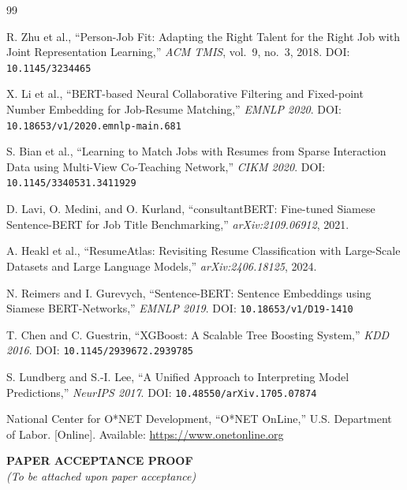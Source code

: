\documentclass[12pt,a4paper]{report}
\begin{document}
\newpage
\begin{thebibliography}{99}

R. Zhu et al., ``Person-Job Fit: Adapting the Right Talent for the Right Job with Joint Representation Learning,'' \textit{ACM TMIS}, vol.~9, no.~3, 2018. DOI: \texttt{10.1145/3234465}

X. Li et al., ``BERT-based Neural Collaborative Filtering and Fixed-point Number Embedding for Job-Resume Matching,'' \textit{EMNLP 2020}. DOI: \texttt{10.18653/v1/2020.emnlp-main.681}

S. Bian et al., ``Learning to Match Jobs with Resumes from Sparse Interaction Data using Multi-View Co-Teaching Network,'' \textit{CIKM 2020}. DOI: \texttt{10.1145/3340531.3411929}

D. Lavi, O. Medini, and O. Kurland, ``consultantBERT: Fine-tuned Siamese Sentence-BERT for Job Title Benchmarking,'' \textit{arXiv:2109.06912}, 2021.

A. Heakl et al., ``ResumeAtlas: Revisiting Resume Classification with Large-Scale Datasets and Large Language Models,'' \textit{arXiv:2406.18125}, 2024.

N. Reimers and I. Gurevych, ``Sentence-BERT: Sentence Embeddings using Siamese BERT-Networks,'' \textit{EMNLP 2019}. DOI: \texttt{10.18653/v1/D19-1410}

T. Chen and C. Guestrin, ``XGBoost: A Scalable Tree Boosting System,'' \textit{KDD 2016}. DOI: \texttt{10.1145/2939672.2939785}

S. Lundberg and S.-I. Lee, ``A Unified Approach to Interpreting Model Predictions,'' \textit{NeurIPS 2017}. DOI: \texttt{10.48550/arXiv.1705.07874}

National Center for O*NET Development, ``O*NET OnLine,'' U.S. Department of Labor. [Online]. Available: \url{https://www.onetonline.org}

\end{thebibliography}

\newpage
\thispagestyle{plain}
\begin{center}
\vspace*{5cm}
{\Large \textbf{PAPER ACCEPTANCE PROOF}}\\[20pt]
\textit{(To be attached upon paper acceptance)}
\end{center}
\end{document}
